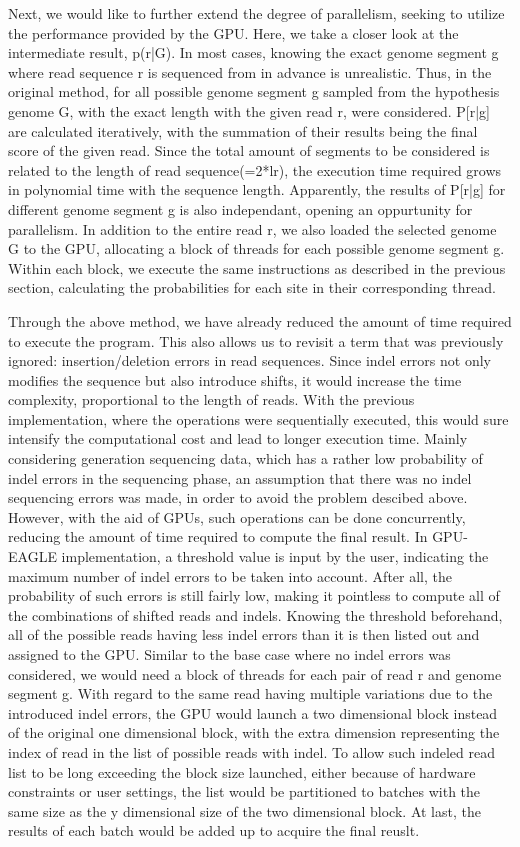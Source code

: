 \documentclass{PHlab-thesis}
\begin{document}
Next, we would like to further extend the degree of parallelism, seeking to utilize the performance provided by the GPU. Here, we take a closer look at the intermediate result, p(r|G). In most cases, knowing the exact genome segment g where read sequence r is sequenced from in advance is unrealistic. Thus, in the original method, for all possible genome segment g sampled from the hypothesis genome G, with the exact length with the given read r, were considered. P[r|g] are calculated iteratively, with the summation of their results being the final score of the given read. Since the total amount of segments to be considered is related to the length of read sequence(=2*lr), the execution time required grows in polynomial time with the sequence length. Apparently, the results of P[r|g] for different genome segment g is also independant, opening an oppurtunity for parallelism. In addition to the entire read r, we also loaded the selected genome G to the GPU, allocating a block of threads for each possible genome segment g. Within each block, we execute the same instructions as described in the previous section, calculating the probabilities for each site in their corresponding thread.

Through the above method, we have already reduced the amount of time required to execute the program. This also allows us to revisit a term that was previously ignored: insertion/deletion errors in read sequences. Since indel errors not only modifies the sequence but also introduce shifts, it would increase the time complexity, proportional to the length of reads. With the previous implementation, where the operations were sequentially executed, this would sure intensify the computational cost and lead to longer execution time. Mainly considering generation sequencing data, which has a rather low probability of indel errors in the sequencing phase, an assumption that there was no indel sequencing errors was made, in order to avoid the problem descibed above. However, with the aid of GPUs, such operations can be done concurrently, reducing the amount of time required to compute the final result. In GPU-EAGLE implementation, a threshold value is input by the user, indicating the maximum number of indel errors to be taken into account. After all, the probability of such errors is still fairly low, making it pointless to compute all of the combinations of shifted reads and indels. Knowing the threshold beforehand, all of the possible reads having less indel errors than it is then listed out and assigned to the GPU. Similar to the base case where no indel errors was considered, we would need a block of threads for each pair of read r and genome segment g. With regard to the same read having multiple variations due to the introduced indel errors, the GPU would launch a two dimensional block instead of the original one dimensional block, with the extra dimension representing the index of read in the list of possible reads with indel. To allow such indeled read list to be long exceeding the block size launched, either because of hardware constraints or user settings, the list would be partitioned to batches with the same size as the y dimensional size of the two dimensional block. At last, the results of each batch would be added up to acquire the final reuslt.
\end{document}
